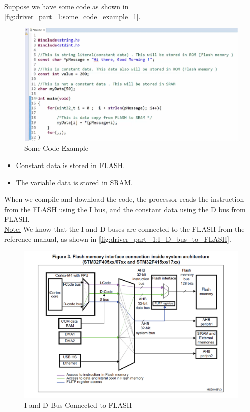 \newpage
Suppose we have some code as shown in \autoref{fig:driver_part_1:some_code_example_1}.

\begin{figure}[h]
\centering
\includegraphics[scale=0.7]{Figures/driver_part_1/some_code_example_1}
\caption{Some Code Example}
\label{fig:driver_part_1:some_code_example_1}
\end{figure} 

\begin{itemize}
    \item Constant data is stored in FLASH.

    \item The variable data is stored in SRAM.
\end{itemize}

When we compile and download the code, the processor reads the instruction from the FLASH using the I bus, and the constant data using the D bus from FLASH.\\

\underline{Note:} We know that the I and D buses are connected to the FLASH from the reference manual, as shown in \autoref{fig:driver_part_1:I_D_bus_to_FLASH}.

\begin{figure}[h]
\centering
\includegraphics[scale=0.7]{Figures/driver_part_1/I_D_bus_to_FLASH}
\caption{I and D Bus Connected to FLASH}
\label{fig:driver_part_1:I_D_bus_to_FLASH}
\end{figure} 


